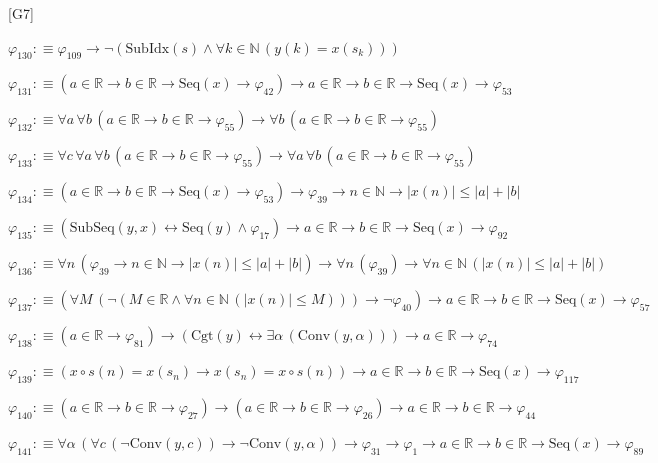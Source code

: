 \begin{fullproof}{[G7]}
\begin{abbrevlist}
\item $\varphi_{130} :\equiv \varphi_{109} \to \neg (\mathrm{SubIdx}(s) \land \forall k \in \mathbb{N}\,(y(k) = x(s_{k})))$
\item $\varphi_{131} :\equiv (a \in \mathbb{R} \to b \in \mathbb{R} \to \mathrm{Seq}(x) \to \varphi_{42}) \to a \in \mathbb{R} \to b \in \mathbb{R} \to \mathrm{Seq}(x) \to \varphi_{53}$
\item $\varphi_{132} :\equiv \forall a\,\forall b\,(a \in \mathbb{R} \to b \in \mathbb{R} \to \varphi_{55}) \to \forall b\,(a \in \mathbb{R} \to b \in \mathbb{R} \to \varphi_{55})$
\item $\varphi_{133} :\equiv \forall c\,\forall a\,\forall b\,(a \in \mathbb{R} \to b \in \mathbb{R} \to \varphi_{55}) \to \forall a\,\forall b\,(a \in \mathbb{R} \to b \in \mathbb{R} \to \varphi_{55})$
\item $\varphi_{134} :\equiv (a \in \mathbb{R} \to b \in \mathbb{R} \to \mathrm{Seq}(x) \to \varphi_{53}) \to \varphi_{39} \to n \in \mathbb{N} \to \lvert x(n) \rvert \leq \lvert a \rvert + \lvert b \rvert$
\item $\varphi_{135} :\equiv (\mathrm{SubSeq}(y,x) \leftrightarrow \mathrm{Seq}(y) \land \varphi_{17}) \to a \in \mathbb{R} \to b \in \mathbb{R} \to \mathrm{Seq}(x) \to \varphi_{92}$
\item $\varphi_{136} :\equiv \forall n\,(\varphi_{39} \to n \in \mathbb{N} \to \lvert x(n) \rvert \leq \lvert a \rvert + \lvert b \rvert) \to \forall n\,(\varphi_{39}) \to \forall n \in \mathbb{N}\,(\lvert x(n) \rvert \leq \lvert a \rvert + \lvert b \rvert)$
\item $\varphi_{137} :\equiv (\forall M\,(\neg (M \in \mathbb{R} \land \forall n \in \mathbb{N}\,(\lvert x(n) \rvert \leq M))) \to \neg \varphi_{40}) \to a \in \mathbb{R} \to b \in \mathbb{R} \to \mathrm{Seq}(x) \to \varphi_{57}$
\item $\varphi_{138} :\equiv (a \in \mathbb{R} \to \varphi_{81}) \to (\mathrm{Cgt}(y) \leftrightarrow \exists \alpha\,(\mathrm{Conv}(y,\alpha))) \to a \in \mathbb{R} \to \varphi_{74}$
\item $\varphi_{139} :\equiv (x \circ s(n) = x(s_{n}) \to x(s_{n}) = x \circ s(n)) \to a \in \mathbb{R} \to b \in \mathbb{R} \to \mathrm{Seq}(x) \to \varphi_{117}$
\item $\varphi_{140} :\equiv (a \in \mathbb{R} \to b \in \mathbb{R} \to \varphi_{27}) \to (a \in \mathbb{R} \to b \in \mathbb{R} \to \varphi_{26}) \to a \in \mathbb{R} \to b \in \mathbb{R} \to \varphi_{44}$
\item $\varphi_{141} :\equiv \forall \alpha\,(\forall c\,(\neg \mathrm{Conv}(y,c)) \to \neg \mathrm{Conv}(y,\alpha)) \to \varphi_{31} \to \varphi_{1} \to a \in \mathbb{R} \to b \in \mathbb{R} \to \mathrm{Seq}(x) \to \varphi_{89}$

\end{abbrevlist}
\end{fullproof}

